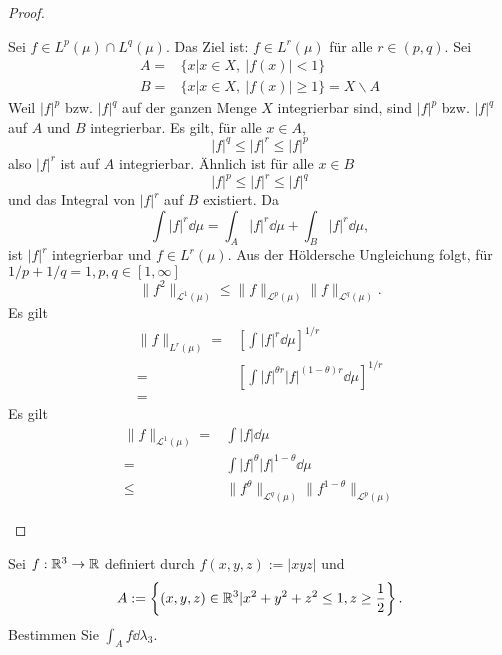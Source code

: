 \begin{proof}
	\begin{parts}
	\item Sei $f\in L^p(\mu)\cap L^q(\mu)$. Das Ziel ist: $f\in L^r(\mu)$ f\"{u}r alle $r\in (p,q)$. Sei
\begin{align*}
	A=&\{x|x\in X,~|f(x)|<1\} \\
	B=&\{x|x\in X,~|f(x)|\ge 1\}=X\backslash A
\end{align*}
Weil $|f|^p$ bzw. $|f|^q$ auf der ganzen Menge $X$ integrierbar sind, sind $|f|^p$ bzw. $|f|^q$ auf $A$ und $B$ integrierbar. Es gilt, f\"{u}r alle $x\in A$,
\[
|f|^q \le |f|^r \le |f|^p
\]
also $|f|^r$ ist auf $A$ integrierbar. Ähnlich ist f\"{u}r alle $x\in B$ 
\[
|f|^p\le |f|^r\le |f|^q
\]
und das Integral von $|f|^r$ auf $B$ existiert. Da
\[
	\int |f|^r\dd{\mu}=\int_A |f|^r\dd{\mu}+\int_B |f|^r\dd{\mu}
,\]
ist $|f|^r$ integrierbar und $f\in L^r(\mu)$. Aus der Höldersche Ungleichung folgt, f\"{u}r $1 / p + 1 / q = 1, p,q\in [1,\infty]$
\[
	\|f^2\|_{\mathcal{L}^1(\mu)}\le \|f\|_{\mathcal{L}^p(\mu)}\|f\|_{\mathcal{L}^q(\mu)}
.\] 
Es gilt
\begin{align*}
	\|f\|_{L^r(\mu)}=&\left[ \int |f|^{r}\dd{\mu} \right]^{1 / r}\\
	=&\left[ \int |f|^{\theta r}|f|^{(1-\theta)r}\dd{\mu} \right]^{1 / r}\\
	=& 
\end{align*}
Es gilt
\begin{align*}
	\|f\|_{\mathcal{L}^1(\mu)}=&\int |f|\dd{\mu}\\
	=& \int |f|^{\theta}|f|^{1-\theta}\dd{\mu}\\
	\le&\|f^\theta\|_{\mathcal{L}^q(\mu)} \|f^{1-\theta}\|_{\mathcal{L}^{p}(\mu)}
\end{align*}
	\end{parts}
\end{proof}
\begin{Problem}
	Sei $f:\mathbb{R}^3\to \mathbb{R}$ definiert durch $f(x,y,z):=|xyz|$ und
	\[
		A:=\left\{ (x,y,z)\in \mathbb{R}^3|x^2+y^2+z^2\le 1, z\ge \frac{1}{2} \right\} 
	.\] 
	Bestimmen Sie $\int_A f\dd{\lambda_3}$.
\end{Problem}
